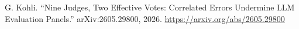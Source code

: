  G. Kohli. ``Nine Judges, Two Effective Votes: Correlated
Errors Undermine LLM Evaluation Panels.'' arXiv:2605.29800, 2026.
\url{https://arxiv.org/abs/2605.29800}
